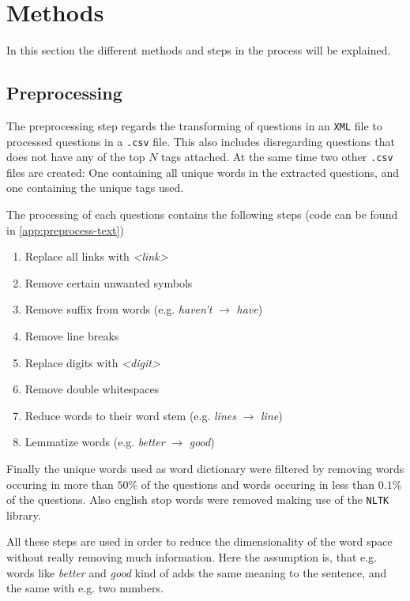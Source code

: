 
\section{Methods}

In this section the different methods and steps in the process will be explained.

\subsection{Preprocessing}

The preprocessing step regards the transforming of questions in an \texttt{XML}
file to processed questions in a \texttt{.csv} file. This also includes disregarding
questions that does not have any of the top $N$ tags attached.
At the same time two other \texttt{.csv} files are created: One containing all
unique words in the extracted questions, and one containing the unique tags used.

The processing of each questions contains the following steps (code can be found
in \cref{app:preprocess-text})
\begin{enumerate}
  \item Replace all links with \textit{<link>}
  \item Remove certain unwanted symbols
  \item Remove suffix from words (e.g. \textit{haven't} $\rightarrow$ \textit{have})
  \item Remove line breaks
  \item Replace digits with \textit{<digit>}
  \item Remove double whitespaces
  \item Reduce words to their word stem (e.g. \textit{lines} $\rightarrow$ \textit{line})
  \item Lemmatize words (e.g. \textit{better} $\rightarrow$ \textit{good})
\end{enumerate}

Finally the unique words used as word dictionary were filtered by removing
words occuring in more than $50\%$ of the questions and words occuring in less
than $0.1\%$ of the questions. Also english stop words were removed making use
of the \texttt{NLTK} library.

All these steps are used in order to reduce the dimensionality of the word space
without really removing much information. Here the assumption is, that e.g. words
like \textit{better} and \textit{good} kind of adds the same meaning to the
sentence, and the same with e.g. two numbers.


